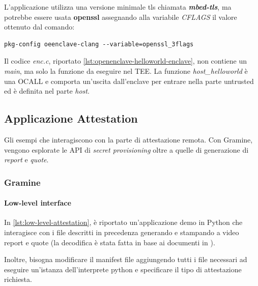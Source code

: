 \documentclass{article}
\begin{document}
L'applicazione utilizza una versione minimale tls chiamata \textbf{\textit{mbed-tls}}, ma potrebbe essere usata \textbf{openssl} assegnando alla variabile \textit{CFLAGS} il valore ottenuto dal comando:

\begin{verbatim}
pkg-config oeenclave-clang --variable=openssl_3flags 
\end{verbatim}



Il codice \textit{enc.c}, riportato \cref{lst:openenclave-helloworld-enclave}, non contiene un \textit{main}, ma solo la funzione da eseguire nel TEE. La funzione \textit{host\_helloworld} è una OCALL e comporta un'uscita dall'enclave per entrare nella parte untrusted ed è definita nel parte \textit{host}.



\subsection{Applicazione Attestation}
Gli esempi che interagiscono con la parte di attestazione remota. Con Gramine, vengono esplorate le API di \textit{secret provisioning} oltre a quelle di generazione di \textit{report} e \textit{quote}.

\subsubsection{Gramine}
\paragraph{Low-level interface}
In \cref{lst:low-level-attestation}, è riportato un'applicazione demo in Python che interagisce con i file descritti in precedenza generando e stampando a video report e quote (la decodifica è stata fatta in base ai documenti in \cite{IntelSDK}). 



Inoltre, bisogna modificare il manifest file aggiungendo tutti i file necessari ad eseguire un'istanza dell'interprete python e specificare il tipo di attestazione richiesta.
\end{document}
